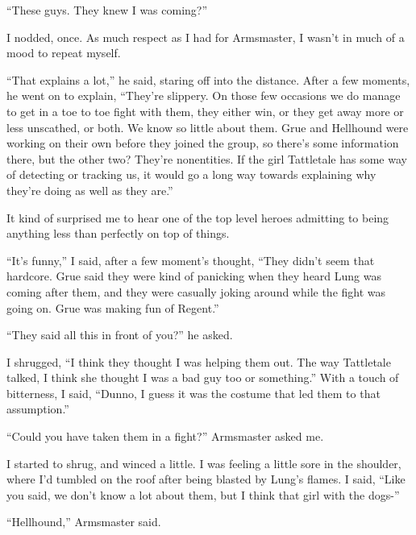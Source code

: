 ``These guys.  They knew I was coming?''



I nodded, once.  As much respect as I had for Armsmaster, I wasn't in much of a mood to repeat myself.



``That explains a lot,'' he said, staring off into the distance.  After a few moments, he went on to explain, ``They're slippery.  On those few occasions we do manage to get in a toe to toe fight with them, they either win, or they get away more or less unscathed, or both.  We know so little about them.  Grue and Hellhound were working on their own before they joined the group, so there's some information there, but the other two?  They're nonentities.  If the girl Tattletale has some way of detecting or tracking us, it would go a long way towards explaining why they're doing as well as they are.''



It kind of surprised me to hear one of the top level heroes admitting to being anything less than perfectly on top of things.



``It's funny,'' I said, after a few moment's thought, ``They didn't seem that hardcore.  Grue said they were kind of panicking when they heard Lung was coming after them, and they were casually joking around while the fight was going on.  Grue was making fun of Regent.''



``They said all this in front of you?'' he asked.



I shrugged, ``I think they thought I was helping them out.  The way Tattletale talked, I think she thought I was a bad guy too or something.''  With a touch of bitterness, I said, ``Dunno, I guess it was the costume that led them to that assumption.''



``Could you have taken them in a fight?'' Armsmaster asked me.



I started to shrug, and winced a little.  I was feeling a little sore in the shoulder, where I'd tumbled on the roof after being blasted by Lung's flames.  I said, ``Like you said, we don't know a lot about them, but I think that girl with the dogs-''



``Hellhound,'' Armsmaster said.



